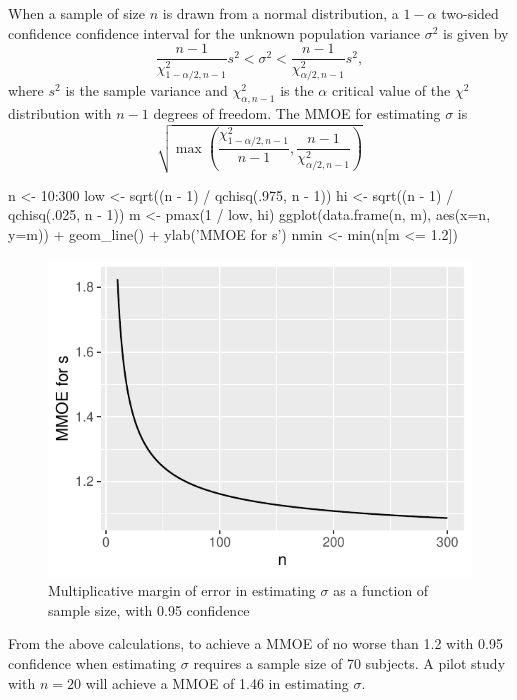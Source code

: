 When a sample of size $n$ is
drawn from a normal distribution, a $1 - \alpha$ two-sided confidence confidence
interval for the unknown population variance $\sigma^2$ is
given by
\begin{equation}
  \frac{n-1}{\chi^{2}_{1-\alpha/2,n-1}} s^{2} < \sigma^{2} <
  \frac{n-1}{\chi^{2}_{\alpha/2,n-1}} s^{2},
  \end{equation}
where $s^2$ is the sample variance and $\chi^{2}_{\alpha,n-1}$ is the
$\alpha$ critical value of the $\chi^2$ distribution with $n-1$
degrees of freedom.  The MMOE for estimating $\sigma$ is
\begin{equation}
  \sqrt{\max(\frac{\chi^{2}_{1-\alpha/2,n-1}}{n-1},
  \frac{n-1}{\chi^{2}_{\alpha/2,n-1}})}
\end{equation}
\begin{Schunk}
\begin{Sinput}
n    <- 10:300
low  <- sqrt((n - 1) / qchisq(.975, n - 1))
hi   <- sqrt((n - 1) / qchisq(.025, n - 1))
m    <- pmax(1 / low, hi)
ggplot(data.frame(n, m), aes(x=n, y=m)) + geom_line() +
  ylab('MMOE for s')
nmin <- min(n[m <= 1.2])
\end{Sinput}
\begin{figure}[htbp]

\centerline{\includegraphics[width=\maxwidth]{htest-smmoe-1} }

\caption[Margin of error in estimating $\sigma$]{Multiplicative margin of error in estimating $\sigma$ as a function of sample size, with 0.95 confidence}\label{fig:htest-smmoe}
\end{figure}
\end{Schunk}
From the above calculations, to achieve a MMOE of no worse than 1.2
with 0.95 confidence when estimating $\sigma$ requires a sample size
of 70 subjects.  A pilot study with $n=20$ will achieve a
MMOE of 1.46 in estimating $\sigma$.

